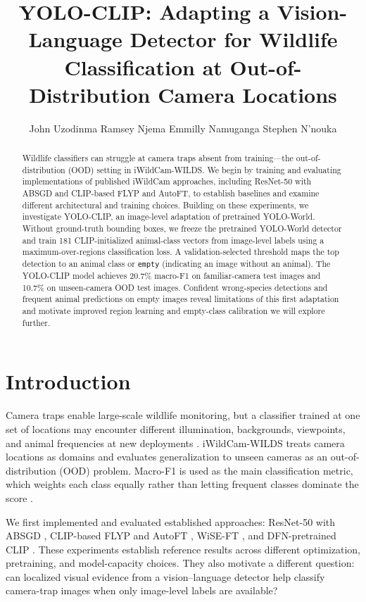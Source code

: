 \documentclass{article}
\title{YOLO-CLIP: Adapting a Vision-Language Detector for Wildlife Classification at Out-of-Distribution Camera Locations}
\author{John Uzodinma \And Ramsey Njema \AND Emmilly Namuganga \And Stephen N'nouka}
\begin{document}
\maketitle

\begin{abstract}
Wildlife classifiers can struggle at camera traps absent from training---the
out-of-distribution (OOD) setting in iWildCam-WILDS. We begin by training and evaluating
implementations of published iWildCam approaches, including ResNet-50 with ABSGD and
CLIP-based FLYP and AutoFT, to establish baselines and examine different architectural
and training choices. Building on these experiments, we investigate YOLO-CLIP, an
image-level adaptation of pretrained YOLO-World. Without ground-truth bounding boxes,
we freeze the pretrained YOLO-World detector and train 181 CLIP-initialized animal-class
vectors from image-level labels using a maximum-over-regions classification loss. A
validation-selected threshold maps the top detection to an animal class or
\texttt{empty} (indicating an image without an animal). The YOLO-CLIP model achieves
20.7\% macro-F1 on familiar-camera test images and 10.7\% on unseen-camera OOD test
images. Confident wrong-species detections and frequent animal predictions on empty images reveal
limitations of this first adaptation and motivate improved region learning and
empty-class calibration we will explore further.
\end{abstract}


\section{Introduction}
Camera traps enable large-scale wildlife monitoring, but a classifier trained at one
set of locations may encounter different illumination, backgrounds, viewpoints, and
animal frequencies at new deployments \citep{beery2020iwildcam,pmlr-v139-koh21a}.
iWildCam-WILDS treats camera locations as domains and evaluates generalization to
unseen cameras as an out-of-distribution (OOD) problem. Macro-F1 is used as the main 
classification metric, which weights each class equally rather than letting frequent
classes dominate the score \citep{pmlr-v139-koh21a}.

We first implemented and evaluated established approaches: ResNet-50 with ABSGD
\citep{qi2023absgd}, CLIP-based FLYP \citep{goyal2023flyp} and AutoFT
\citep{choi2024autoft}, WiSE-FT \citep{wortsman2022wiseft}, and DFN-pretrained CLIP
\citep{fang2023dfn}. These experiments establish reference results across different
optimization, pretraining, and model-capacity choices. They also motivate a different 
question: can localized visual evidence from a vision–language detector help classify 
camera-trap images when only image-level labels are available?
\end{document}
